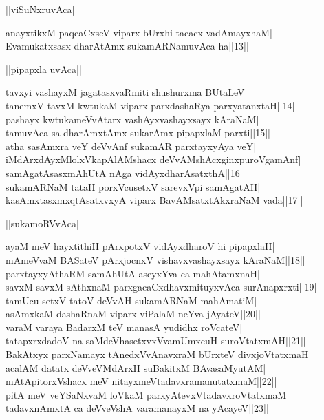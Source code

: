\documentclass{article}
\begin{document}
\begin{center}
||viSuNxruvAca||
\end{center}

anayxtikxM paqcaCxseV viparx bUrxhi tacacx vadAmayxhaM|\\
Evamukatxsasx dharAtAmx sukamARNamuvAca ha||13||\\

\begin{center}
||pipapxla uvAca||
\end{center}

tavxyi vashayxM jagatasxvaRmiti shushurxma BUtaLeV|\\
tanemxV tavxM kwtukaM viparx parxdashaRya parxyatanxtaH||14||\\
pashayx kwtukameVvAtarx vashAyxvashayxsayx kAraNaM|\\
tamuvAca sa dharAmxtAmx sukarAmx pipapxlaM parxti||15||\\
atha sasAmxra veY deVvAnf sukamAR parxtayxyAya veY|\\
iMdArxdAyxMlolxVkapAlAMshacx deVvAMshAcxginxpuroVgamAnf|\\
samAgatAsasxmAhUtA nAga vidAyxdharAsatxthA||16||\\
sukamARNaM tataH porxVcusetxV sarevxVpi samAgatAH|\\
kasAmxtasxmxqtAsatxvxyA viparx BavAMsatxtAkxraNaM vada||17||\\

\begin{center}
||sukamoRVvAca||
\end{center}

ayaM meV hayxtithiH pArxpotxV vidAyxdharoV hi pipapxlaH|\\
mAmeVvaM BASateV pArxjocnxV vishavxvashayxsayx kAraNaM||18||\\
parxtayxyAthaRM samAhUtA aseyxYva ca mahAtamxnaH|\\
savxM savxM sAthxnaM parxgacaCxdhavxmituyxvAca surAnapxrxti||19||\\
tamUcu setxV tatoV deVvAH sukamARNaM mahAmatiM|\\
asAmxkaM dashaRnaM viparx viPalaM neYva jAyateV||20||\\
varaM varaya BadarxM teV manasA yudidhx roVcateV|\\
tatapxrxdadoV na saMdeVhasetxvxVvamUmxcuH suroVtatxmAH||21||\\
BakAtxyx parxNamayx tAnedxVvAnavxraM bUrxteV divxjoVtatxmaH|\\
acalAM datatx deVveVMdArxH suBakitxM BAvasaMyutAM|\\
mAtApitorxVshacx meV nitayxmeVtadavxramanutatxmaM||22||\\
pitA meV veYSaNxvaM loVkaM parxyAtevxVtadavxroVtatxmaM|\\
tadavxnAmxtA ca deVveVshA varamanayxM na yAcayeV||23||\\
\end{document}
